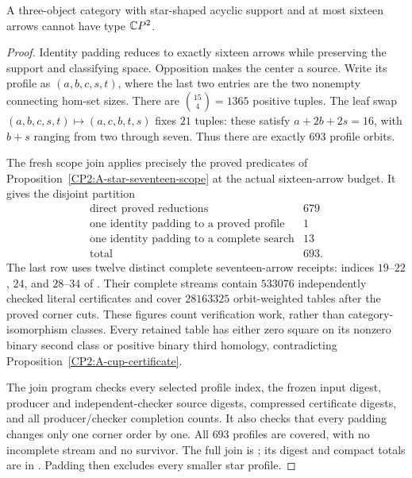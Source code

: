 \begin{theorem}
\label{CP2:A-star-sixteen-complete}
A three-object category with star-shaped acyclic support
and at most sixteen arrows cannot have type $\mathbb{C}P^2$.
\end{theorem}
\begin{proof}
Identity padding reduces to exactly sixteen arrows while
preserving the support and classifying space. Opposition
makes the center a source. Write its profile as
$(a,b,c,s,t)$, where the last two entries are the two
nonempty connecting hom-set sizes. There are
$\binom{15}{4}=1365$ positive tuples. The leaf swap
$(a,b,c,s,t)\mapsto(a,c,b,t,s)$ fixes $21$ tuples:
these satisfy $a+2b+2s=16$, with $b+s$ ranging from two
through seven. Thus there are exactly $693$ profile orbits.

The fresh scope join applies precisely the proved
predicates of Proposition~\ref{CP2:A-star-seventeen-scope}
at the actual sixteen-arrow budget. It gives the disjoint
partition
\[
\begin{array}{l|r}
\text{direct proved reductions}&679\\
\text{one identity padding to a proved profile}&1\\
\text{one identity padding to a complete search}&13\\\hline
\text{total}&693.
\end{array}
\]
The last row uses twelve distinct complete seventeen-arrow
receipts: indices $19$--$22$, $24$, and $28$--$34$
of .
Their complete streams contain $533076$ independently
checked literal certificates and cover $28163325$
orbit-weighted tables after the proved corner cuts.
These figures count verification work, rather than
category-isomorphism classes. Every retained table has
either zero square on its nonzero binary second class
or positive binary third homology, contradicting
Proposition~\ref{CP2:A-cup-certificate}.

The join program 
checks every selected profile index, the frozen input
digest, producer and independent-checker source digests,
compressed certificate digests, and all producer/checker
completion counts. It also checks that every padding
changes only one corner order by one. All $693$ profiles
are covered, with no incomplete stream and no survivor.
The full join is
;
its digest and compact totals are in
.
Padding then excludes every smaller star profile.
\end{proof}
